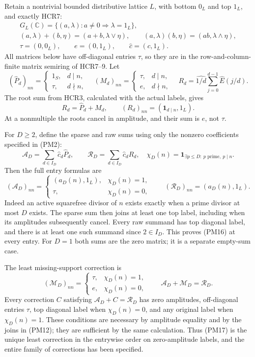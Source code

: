 \documentclass[
  10pt,
  a4paper,
]{article}
\begin{document}
Retain a nontrivial bounded distributive lattice \(L\), with bottom
\(0_L\) and top \(1_L\), and exactly HCR7: \[
\begin{gathered}
G_L(\mathbb C)=\{(a,\lambda):a\ne0\Longrightarrow\lambda=1_L\},\\
(a,\lambda)+(b,\eta)=(a+b,\lambda\vee\eta),\qquad
(a,\lambda)(b,\eta)=(ab,\lambda\wedge\eta),\\
\tau=(0,0_L),\qquad e=(0,1_L),\qquad\widehat c=(c,1_L).
\end{gathered}
\tag{PM12}
\] All matrices below have off-diagonal entries \(\tau\), so they are in
the row-and-column-finite matrix semiring of HCR7--9. Let \[
(\widehat P_d)_{nn}=\begin{cases}1_S,&d\mid n,\\\tau,&d\nmid n,\end{cases}
\quad
(M_d)_{nn}=\begin{cases}\tau,&d\mid n,\\e,&d\nmid n,\end{cases}
\quad
R_d=\widehat{1/d}\sum_{j=0}^{d-1}\widehat E(j/d).
\tag{PM13}
\] The root sum from HCR3, calculated with the actual labels, gives \[
R_d=\widehat P_d+M_d,
\qquad (R_d)_{nn}=(\mathbf1_{d\mid n},1_L).
\tag{PM14}
\] At a nonmultiple the roots cancel in amplitude, and their sum is
\(e\), not \(\tau\).

For \(D\ge2\), define the sparse and raw sums using only the nonzero
coefficients specified in (PM2): \[
\mathcal A_D=\sum_{d\in I_D}\widehat c_d\widehat P_d,
\qquad \mathcal R_D=\sum_{d\in I_D}\widehat c_d R_d,
\quad
\chi_D(n)=\mathbf1_{\exists p\le D:\ p\text{ prime},\ p\mid n}.
\tag{PM15}
\] Then the full entry formulas are \[
(\mathcal A_D)_{nn}=\begin{cases}(a_D(n),1_L),&\chi_D(n)=1,\\\tau,&\chi_D(n)=0,\end{cases}
\qquad
(\mathcal R_D)_{nn}=(a_D(n),1_L).
\tag{PM16}
\] Indeed an active squarefree divisor of \(n\) exists exactly when a
prime divisor at most \(D\) exists. The sparse sum then joins at least
one top label, including when its amplitudes subsequently cancel. Every
raw summand has top diagonal label, and there is at least one such
summand since \(2\in I_D\). This proves (PM16) at every entry. For
\(D=1\) both sums are the zero matrix; it is a separate empty-sum case.

The least missing-support correction is \[
(\mathcal M_D)_{nn}=\begin{cases}\tau,&\chi_D(n)=1,\\e,&\chi_D(n)=0,\end{cases}
\qquad
\boxed{\mathcal A_D+\mathcal M_D=\mathcal R_D.}
\tag{PM17}
\] Every correction \(C\) satisfying \(\mathcal A_D+C=\mathcal R_D\) has
zero amplitudes, off-diagonal entries \(\tau\), top diagonal label when
\(\chi_D(n)=0\), and any original label when \(\chi_D(n)=1\). These
conditions are necessary by amplitude equality and by the joins in
(PM12); they are sufficient by the same calculation. Thus (PM17) is the
unique least correction in the entrywise order on zero-amplitude labels,
and the entire family of corrections has been specified.
\end{document}
